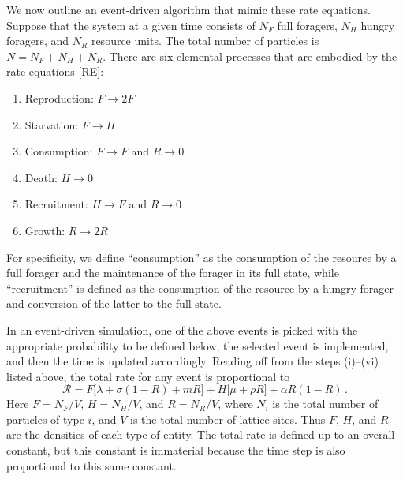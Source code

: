 \documentclass[11pt]{iopart}
\begin{document}
We now outline an event-driven algorithm that mimic these rate equations.
Suppose that the system at a given time consists of $N_F$ full foragers,
$N_H$ hungry foragers, and $N_R$ resource units.  The total number of
particles is $N=N_F+N_H+N_R$.  There are six elemental processes that are
embodied by the rate equations \eqref{RE}:
\newpage
\begin{enumerate}
\item Reproduction:  $F\to 2F$
\item Starvation:  $F\to H$
\item Consumption: $F\to F$ and $R\to 0$
\item Death: $H\to 0$
\item Recruitment: $H\to F$ and $R\to 0$
\item Growth: $R\to 2R$
\end{enumerate}
For specificity, we define ``consumption'' as the consumption of the resource
by a full forager and the maintenance of the forager in its full state, while
``recruitment'' is defined as the consumption of the resource by a hungry
forager and conversion of the latter to the full state.

In an event-driven simulation, one of the above events is picked with the
appropriate probability to be defined below, the selected event is
implemented, and then the time is updated accordingly.  Reading off from the
steps (i)--(vi) listed above, the total rate for any event is proportional to
\begin{equation}
\mathcal{R}=F\big[\lambda +\sigma(1-R)+mR\big]+ H\big[\mu+\rho R\big]+
\alpha R(1-R)\,.
\end{equation}
Here $F=N_F/V$, $H=N_H/V$, and $R=N_R/V$, where $N_i$ is the total number of
particles of type $i$, and $V$ is the total number of lattice sites.  Thus
$F$, $H$, and $R$ are the densities of each type of entity.  The total rate
is defined up to an overall constant, but this constant is immaterial because
the time step is also proportional to this same constant.
\end{document}
